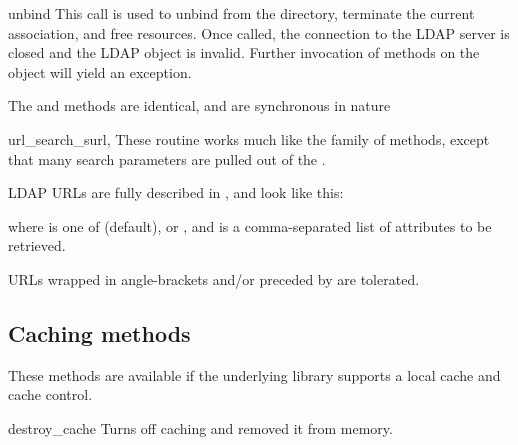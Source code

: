 
\begin{methoddesc}[int]{unbind}{}
This call is used to unbind from the directory, terminate the current
association, and free resources. Once called, the connection to the
LDAP server is closed and the LDAP object is invalid. Further invocation
of methods on the object will yield an exception.

The  and  methods are identical, and are 
synchronous in nature
\end{methoddesc}


\begin{methoddesc}{url_search_s}{url, }
These routine works much like the  family of methods, 
except that many search parameters are pulled out of the . 

LDAP URLs are fully described in , and look like this: 


where  is one of  (default),  or ,
and  is a comma-separated list of attributes to be retrieved.

URLs wrapped in angle-brackets and/or preceded by  are 
tolerated.
\end{methoddesc}

\subsection{Caching methods}

These methods are available if the underlying library supports a local cache
and cache control.


\begin{methoddesc}{destroy_cache}{}
Turns off caching and removed it from memory.
\end{methoddesc}


